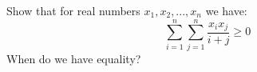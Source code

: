 Show that for real numbers $x_1, x_2, ... , x_n$ we have:
\[ \sum\limits_{i=1}^n \sum\limits_{j=1}^n \dfrac{x_ix_j}{i+j} \geq 0  \]
When do we have equality?
